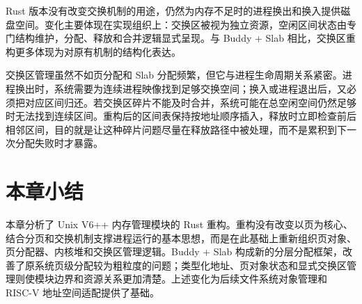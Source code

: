 Rust 版本没有改变交换机制的用途，仍然为内存不足时的进程换出和换入提供磁盘空间。变化主要体现在实现组织上：交换区被视为独立资源，空闲区间状态由专门结构维护，分配、释放和合并逻辑显式呈现。与 Buddy + Slab 相比，交换区重构更多体现为对原有机制的结构化表达。

交换区管理虽然不如页分配和 Slab 分配频繁，但它与进程生命周期关系紧密。进程换出时，系统需要为连续进程映像找到足够交换空间；换入或进程退出后，又必须把对应区间归还。若交换区碎片不能及时合并，系统可能在总空闲空间仍然足够时无法找到连续区间。重构后的区间表保持按地址顺序插入，释放时立即检查前后相邻区间，目的就是让这种碎片问题尽量在释放路径中被处理，而不是累积到下一次分配失败时才暴露。

\section{本章小结}

本章分析了 Unix V6++ 内存管理模块的 Rust 重构。重构没有改变以页为核心、结合分页和交换机制支撑进程运行的基本思想，而是在此基础上重新组织页对象、页分配器、内核堆和交换区管理逻辑。Buddy + Slab 构成新的分层分配框架，改善了原系统页级分配较为粗粒度的问题；类型化地址、页对象状态和显式交换区管理则使模块边界和资源关系更加清楚。上述变化为后续文件系统对象管理和 RISC-V 地址空间适配提供了基础。
